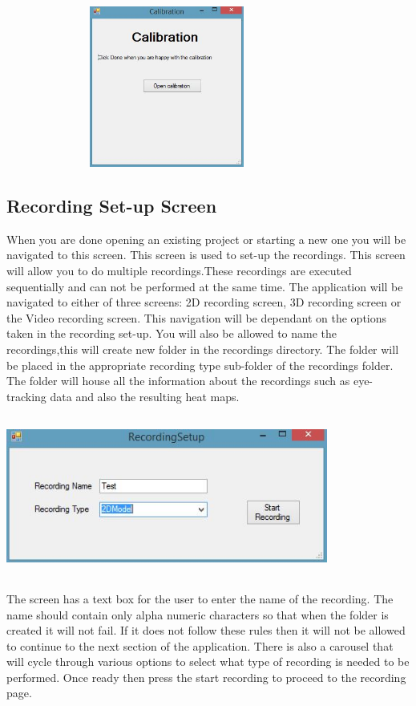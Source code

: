 \includegraphics[width=400px,height=200px]{./Images/CalibrationStarter.JPG}

\subsection{Recording Set-up Screen}
When you are done opening an existing project or starting a new one you will be navigated to this screen. This screen is used to set-up the recordings. This screen will allow you to do multiple recordings.These recordings are executed sequentially and can not be performed at the same time.
The application will be navigated to either of three screens: 2D recording screen, 3D recording screen or the Video recording screen. This navigation will be dependant on the options taken in the recording set-up.
You will also be allowed to name the recordings,this will create new folder in the recordings directory. The folder will be placed in the appropriate recording type sub-folder of the recordings folder. The folder will house all the information about the recordings such as eye-tracking data and also the resulting heat maps.

\includegraphics[width=400px,height=200px]{./Images/Recordingsetup.JPG}

The screen has a text box for the user to enter the name of the recording. The name should contain only alpha numeric characters so that when the folder is created it will not fail. If it does not follow these rules then it will not be allowed to continue to the next section of the application. There is also a carousel that will cycle through various options to select what type of recording is needed to be performed. Once ready then press the start recording to proceed to the recording page.

